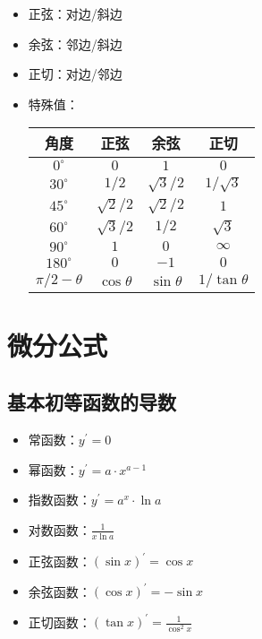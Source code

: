 \begin{itemize}
    \item 正弦：对边/斜边
    \item 余弦：邻边/斜边
    \item 正切：对边/邻边
    \item 特殊值：
    \begin{center}
        \renewcommand\arraystretch{1.2}
        \begin{tabular}{c|ccc}
            \hline
            角度&正弦&余弦&正切\\\hline
            $0^\circ$&$0$&$1$&$0$\\
            $30^\circ$&$1/2$&$\sqrt3/2$&$1/\sqrt3$\\
            $45^\circ$&$\sqrt2/2$&$\sqrt2/2$&$1$\\
            $60^\circ$&$\sqrt3/2$&$1/2$&$\sqrt3$\\
            $90^\circ$&$1$&$0$&$\infty$\\
            $180^\circ$&$0$&$-1$&$0$\\
            $\pi/2-\theta$&$\cos\theta$&$\sin\theta$&$1/\tan\theta$\\
            \hline
        \end{tabular}
    \end{center}
\end{itemize}

\section{微分公式}

\subsection{基本初等函数的导数}

\begin{itemize}
    \item 常函数：$y^\prime=0$
    \item 幂函数：$y^\prime=a\cdot x^{a-1}$
    \item 指数函数：$y^\prime=a^x\cdot\ln a$
    \item 对数函数：$\frac1{x\ln a}$
    \item 正弦函数：$(\sin x)^\prime=\cos x$
    \item 余弦函数：$(\cos x)^\prime=-\sin x$
    \item 正切函数：$(\tan x)^\prime=\frac1{\cos^2x}$
\end{itemize}

